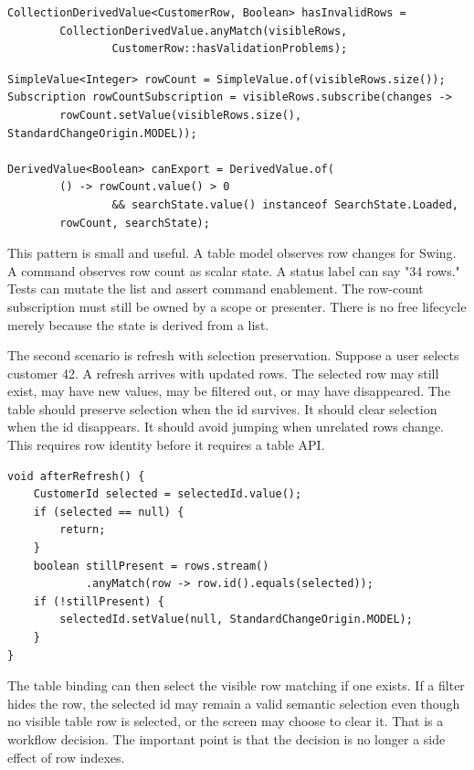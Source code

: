 \begin{lstlisting}[caption={Stream-based collection derivation.}]
CollectionDerivedValue<CustomerRow, Boolean> hasInvalidRows =
        CollectionDerivedValue.anyMatch(visibleRows,
                CustomerRow::hasValidationProblems);
\end{lstlisting}

\begin{lstlisting}[caption={Expose row count as scalar state when commands need it.}]
SimpleValue<Integer> rowCount = SimpleValue.of(visibleRows.size());
Subscription rowCountSubscription = visibleRows.subscribe(changes ->
        rowCount.setValue(visibleRows.size(), StandardChangeOrigin.MODEL));

DerivedValue<Boolean> canExport = DerivedValue.of(
        () -> rowCount.value() > 0
                && searchState.value() instanceof SearchState.Loaded,
        rowCount, searchState);
\end{lstlisting}

This pattern is small and useful. A table model observes row changes for Swing.
A command observes row count as scalar state. A status label can say "34 rows."
Tests can mutate the list and assert command enablement. The row-count
subscription must still be owned by a scope or presenter. There is no free
lifecycle merely because the state is derived from a list.

The second scenario is refresh with selection preservation. Suppose a user
selects customer 42. A refresh arrives with updated rows. The selected row may
still exist, may have new values, may be filtered out, or may have disappeared.
The table should preserve selection when the id survives. It should clear
selection when the id disappears. It should avoid jumping when unrelated rows
change. This requires row identity before it requires a table API.

\begin{lstlisting}[caption={Preserve selected id across a refresh.}]
void afterRefresh() {
    CustomerId selected = selectedId.value();
    if (selected == null) {
        return;
    }
    boolean stillPresent = rows.stream()
            .anyMatch(row -> row.id().equals(selected));
    if (!stillPresent) {
        selectedId.setValue(null, StandardChangeOrigin.MODEL);
    }
}
\end{lstlisting}

The table binding can then select the visible row matching  if
one exists. If a filter hides the row, the selected id may remain a valid
semantic selection even though no visible table row is selected, or the screen
may choose to clear it. That is a workflow decision. The important point is that
the decision is no longer a side effect of row indexes.

